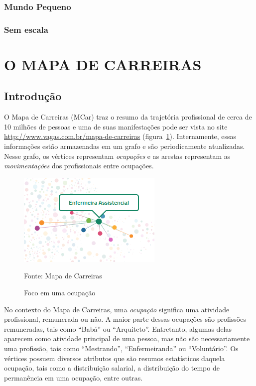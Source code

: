 \documentclass[12pt,a4paper]{article}
\theoremstyle{hypo}
\newcommand{\source}[1]{\vspace{-10pt} \caption*{Fonte: {#1}} }
\begin{document}
\subsubsection{Mundo Pequeno} \label{sec:small-world}

\subsubsection{Sem escala} \label{sec:scale-free}


\section{O MAPA DE CARREIRAS}

\subsection{Introdução}

O Mapa de Carreiras (MCar) traz o resumo da trajetória profissional de cerca de 10 milhões de pessoas e uma de suas manifestações pode ser vista no site \url{http://www.vagas.com.br/mapa-de-carreiras} (figura~\ref{fig:exemplo-grafo}). Internamente, essas informações estão armazenadas em um grafo e são periodicamente atualizadas. Nesse grafo, os vértices representam \textit{ocupações} e as arestas representam as \textit{movimentações} dos profissionais entre ocupações.

\begin{figure}[ht]
  \centering
  \includegraphics[scale=0.8, frame]{mapa-enfermeira-assistencial.png}
  \caption{Foco em uma ocupação}
  \source{Mapa de Carreiras}
  \label{fig:exemplo-grafo}
\end{figure}


No contexto do Mapa de Carreiras, uma \textit{ocupação} significa uma atividade profissional, remunerada ou não. A maior parte dessas ocupações são profissões remuneradas, tais como \enquote{Babá} ou \enquote{Arquiteto}. Entretanto, algumas delas aparecem como atividade principal de uma pessoa, mas não são necessariamente uma profissão, tais como \enquote{Mestrando}, \enquote{Enfermeiranda} ou \enquote{Voluntário}. Os vértices possuem diversos atributos que são resumos estatísticos daquela ocupação, tais como a distribuição salarial, a distribuição do tempo de permanência em uma ocupação, entre outras.
\end{document}
